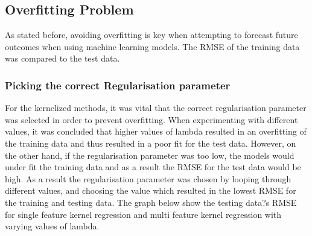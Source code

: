 \documentclass[a4paper,11pt,twoside]{article}
\begin{document}
\subsection{Overfitting Problem}
As stated before, avoiding overfitting is key when attempting to forecast future outcomes when using machine learning models. The RMSE of the training data was compared to the test data.
\vspace{5mm}
\begin{center}
\end{center}
\vspace{5mm}

\subsubsection{Picking the correct Regularisation parameter}

For the kernelized methods, it was vital that the correct regularisation parameter was selected in order to prevent overfitting. When experimenting with different values, it was concluded that higher values of lambda resulted in an overfitting of the training data and thus resulted in a poor fit for the test data. However, on the other hand, if the regularisation parameter was too low, the models would under fit the training data and as a result the RMSE for the test data would be high. As a result the regularisation parameter was chosen by looping through different values, and choosing the value which resulted in the lowest RMSE for the training and testing data. The graph below show the testing data?s RMSE for single feature kernel regression and multi feature kernel regression with varying values of lambda. 
\end{document}
